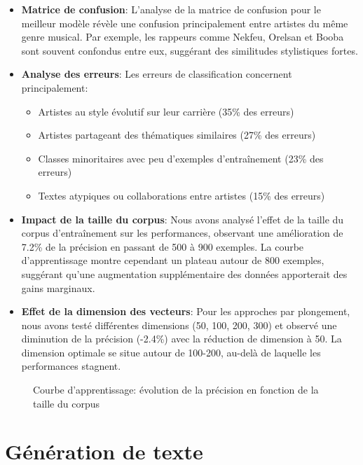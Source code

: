 \documentclass[a4paper,11pt]{article}
\begin{document}
\begin{itemize}
    \item \textbf{Matrice de confusion}: L'analyse de la matrice de confusion pour le meilleur modèle révèle une confusion principalement entre artistes du même genre musical. Par exemple, les rappeurs comme Nekfeu, Orelsan et Booba sont souvent confondus entre eux, suggérant des similitudes stylistiques fortes.
    
    \item \textbf{Analyse des erreurs}: Les erreurs de classification concernent principalement:
    \begin{itemize}
        \item Artistes au style évolutif sur leur carrière (35\% des erreurs)
        \item Artistes partageant des thématiques similaires (27\% des erreurs)
        \item Classes minoritaires avec peu d'exemples d'entraînement (23\% des erreurs)
        \item Textes atypiques ou collaborations entre artistes (15\% des erreurs)
    \end{itemize}
    
    \item \textbf{Impact de la taille du corpus}: Nous avons analysé l'effet de la taille du corpus d'entraînement sur les performances, observant une amélioration de 7.2\% de la précision en passant de 500 à 900 exemples. La courbe d'apprentissage montre cependant un plateau autour de 800 exemples, suggérant qu'une augmentation supplémentaire des données apporterait des gains marginaux.
    
    \item \textbf{Effet de la dimension des vecteurs}: Pour les approches par plongement, nous avons testé différentes dimensions (50, 100, 200, 300) et observé une diminution de la précision (-2.4\%) avec la réduction de dimension à 50. La dimension optimale se situe autour de 100-200, au-delà de laquelle les performances stagnent.
\end{itemize}

\begin{figure}[h]
    \centering
    \caption{Courbe d'apprentissage: évolution de la précision en fonction de la taille du corpus}
    \label{fig:learning-curve}
\end{figure}

\section{Génération de texte}
\label{sec:generation}
\end{document}
